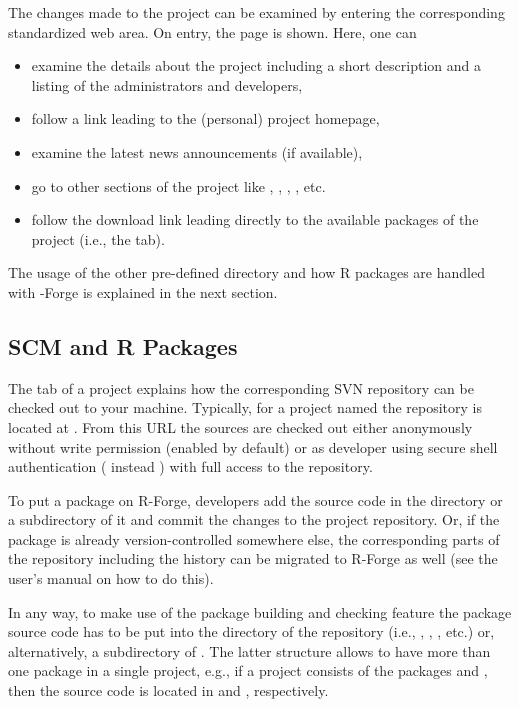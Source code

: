 The changes made to the project can be examined by entering the
corresponding standardized web area. On entry, the 
page is shown. Here, one can 

\begin{itemize}
\item examine the details about the project including a short
  description and a listing of the administrators and developers,
\item follow a link leading to the (personal) project homepage,
\item examine the latest news announcements (if available),
\item go to other sections of the project like
  , ,
   , , etc.
\item follow the download link leading directly to the available
  packages of the project (i.e., the  tab).
\end{itemize}

The usage of the other pre-defined directory  and how R
packages are handled with \R-Forge is explained in the next
section. 


\subsection{SCM and R Packages}

The  tab of a project explains how the corresponding SVN
repository can be checked out to your
machine. Typically, for a project named  the repository is
located at . From
this URL the sources are checked out either 
anonymously without write permission (enabled by default) or as
developer using secure shell 
authentication ( instead ) with full
access to the repository.

To put a package on R-Forge, developers add the source code in the
 directory or a subdirectory of it and commit the changes to
the project repository. Or, if the package is already
version-controlled somewhere else, the corresponding parts of the
repository including the history can be migrated to R-Forge as well
(see the user's manual on how to do this).

In any way, to make use of the package building and checking feature
the package source code has to be put into the  directory
of the repository (i.e., ,
, , etc.) or, alternatively, a 
subdirectory of . The latter structure allows to
have more than one package in a single project, e.g., if
a project consists of the packages  and , then the
source code is located in  and ,
respectively.

